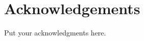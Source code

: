 \phantom{~}

\vfill

\begingroup

\section*{Acknowledgements}

\noindent Put your acknowledgments here.

\endgroup

\vfill